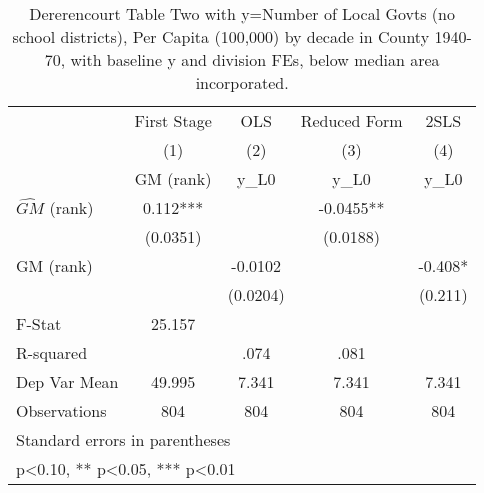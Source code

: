 \begin{table}[htbp]\centering
\def\sym#1{\ifmmode^{#1}\else\(^{#1}\)\fi}
\caption{Dererencourt Table Two with y=Number of Local Govts (no school districts), Per Capita (100,000) by decade in County 1940-70, with baseline y and division FEs, below median area incorporated.}
\begin{tabular}{l*{4}{c}}
\toprule
                    & First Stage   &         OLS   &Reduced Form   &        2SLS   \\
                    &\multicolumn{1}{c}{(1)}&\multicolumn{1}{c}{(2)}&\multicolumn{1}{c}{(3)}&\multicolumn{1}{c}{(4)}\\
                    &\multicolumn{1}{c}{GM  (rank)}&\multicolumn{1}{c}{y\_L0}&\multicolumn{1}{c}{y\_L0}&\multicolumn{1}{c}{y\_L0}\\
\midrule
$\hat{GM}$ (rank)   &       0.112***&               &     -0.0455** &               \\
                    &    (0.0351)   &               &    (0.0188)   &               \\
\addlinespace
GM  (rank)          &               &     -0.0102   &               &      -0.408*  \\
                    &               &    (0.0204)   &               &     (0.211)   \\
\midrule
F-Stat              &      25.157   &               &               &               \\
R-squared           &               &        .074   &        .081   &               \\
Dep Var Mean        &      49.995   &       7.341   &       7.341   &       7.341   \\
Observations        &         804   &         804   &         804   &         804   \\
\bottomrule
\multicolumn{5}{l}{\footnotesize Standard errors in parentheses}\\
\multicolumn{5}{l}{\footnotesize * p<0.10, ** p<0.05, *** p<0.01}\\
\end{tabular}
\end{table}
